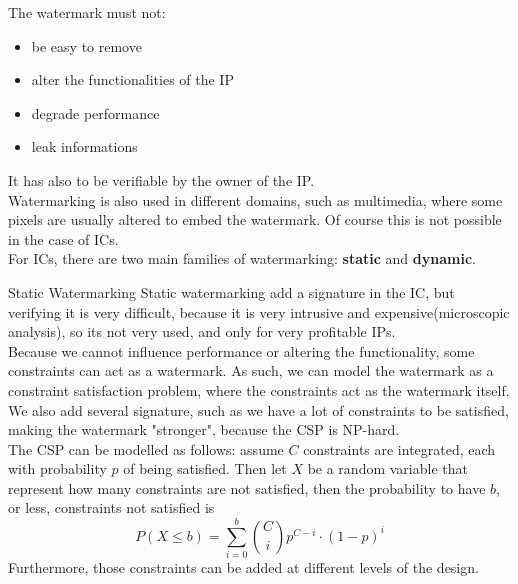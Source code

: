 The watermark must not:
\begin{itemize}
  \item be easy to remove
  \item alter the functionalities of the IP
  \item degrade performance
  \item leak informations
\end{itemize}
It has also to be verifiable by the owner of the IP.\\
Watermarking is also used in different domains, such as multimedia, where some pixels are usually altered 
to embed the watermark. Of course this is not possible in the case of ICs.\\
For ICs, there are two main families of watermarking: \textbf{static} and \textbf{dynamic}.
\begin{section}{Static Watermarking}
  Static watermarking add a signature in the IC, but verifying it is very difficult, because it 
  is very intrusive and expensive(microscopic analysis), so its not very used, and only for very 
  profitable IPs.\\
  Because we cannot influence performance or altering the functionality, some constraints can act 
  as a watermark. As such, we can model the watermark as a constraint satisfaction problem, where the 
  constraints act as the watermark itself.
  We also add several signature, such as we have a lot of constraints to be satisfied, making the 
  watermark "stronger", because the CSP is NP-hard.\\
  The CSP can be modelled as follows: assume $C$ constraints are integrated, each with probability 
  $p$ of being satisfied.
  Then let $X$ be a random variable that represent how many constraints are not satisfied, then 
  the probability to have $b$, or less, constraints not satisfied is
  \begin{equation}
    P(X\le b )=\sum^b_{i=0}\binom{C}{i}p^{C-i}\cdot(1-p)^i
  \end{equation}
  Furthermore, those constraints can be added at different levels of the design.


\end{section}
